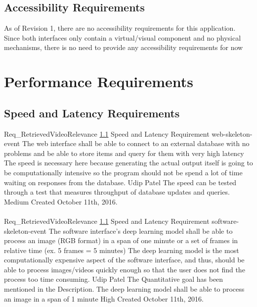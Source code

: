 \documentclass{scrreprt}
\begin{document}
\subsection{Accessibility Requirements}
\label{req-accessibility}
As of Revision 1, there are no accessibility requirements for this application.
Since both interfaces only contain a virtual/visual component and no physical
mechanisms, there is no need to provide any accessibility requirements for now

\section{Performance Requirements}

\subsection{Speed and Latency Requirements}
\label{req-speed-latency}

\requirement
{Req_RetrievedVideoRelevance}
{\ref{req-speed-latency} Speed and Latency Requirement}
{web-skeleton-event}
{The web interface shall be able to connect to an external database with no problems and be able to store items and query for them with very high latency }
{The speed is necessary here because generating the actual output itself is going to be computationally intensive so the program should not be spend a lot of time waiting on responses from the database.}
{Udip Patel}
{The speed can be tested through a test that measures throughput of database updates and queries.}
{Medium}
{Created October 11th, 2016.}
\\ \\

\requirement
{Req_RetrievedVideoRelevance}
{\ref{req-speed-latency} Speed and Latency Requirement}
{software-skeleton-event}
{The software interface's deep learning model shall be able to process an image (RGB format) in a span of one minute or a set of frames in relative time (ex. 5 frames = 5 minutes)}
{The deep learning model is the most computationally expensive aspect of the software interface, and thus, should be able to process images/videos quickly enough so that the user does not find the process too time consuming.}
{Udip Patel}
{The Quantitative goal has been mentioned in the Description. The deep learning model shall be able to process an image in a span of 1 minute}
{High}
{Created October 11th, 2016.}
\\ \\
\end{document}

